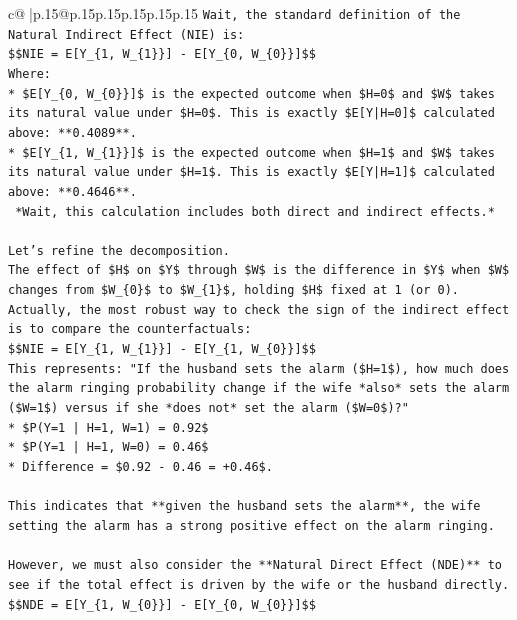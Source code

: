 \documentclass{article}
\begin{document}
{\begin{supertabular}{c@{$\;$}|p{.15\linewidth}@{}p{.15\linewidth}p{.15\linewidth}p{.15\linewidth}p{.15\linewidth}p{.15\linewidth}}
{{{\texttt{Wait, the standard definition of the Natural Indirect Effect (NIE) is:} \\
\texttt{\$\$NIE = E{[}Y\_\{1, W\_\{1\}\}{]} {-} E{[}Y\_\{0, W\_\{0\}\}{]}\$\$} \\
\texttt{Where:} \\
\texttt{*   \$E{[}Y\_\{0, W\_\{0\}\}{]}\$ is the expected outcome when \$H=0\$ and \$W\$ takes its natural value under \$H=0\$. This is exactly \$E{[}Y|H=0{]}\$ calculated above: **0.4089**.} \\
\texttt{*   \$E{[}Y\_\{1, W\_\{1\}\}{]}\$ is the expected outcome when \$H=1\$ and \$W\$ takes its natural value under \$H=1\$. This is exactly \$E{[}Y|H=1{]}\$ calculated above: **0.4646**.} \\
\texttt{    *Wait, this calculation includes both direct and indirect effects.*} \\
\\ 
\texttt{Let's refine the decomposition.} \\
\texttt{The effect of \$H\$ on \$Y\$ through \$W\$ is the difference in \$Y\$ when \$W\$ changes from \$W\_\{0\}\$ to \$W\_\{1\}\$, holding \$H\$ fixed at 1 (or 0).} \\
\texttt{Actually, the most robust way to check the sign of the indirect effect is to compare the counterfactuals:} \\
\texttt{\$\$NIE = E{[}Y\_\{1, W\_\{1\}\}{]} {-} E{[}Y\_\{1, W\_\{0\}\}{]}\$\$} \\
\texttt{This represents: "If the husband sets the alarm (\$H=1\$), how much does the alarm ringing probability change if the wife *also* sets the alarm (\$W=1\$) versus if she *does not* set the alarm (\$W=0\$)?"} \\
\texttt{*   \$P(Y=1 | H=1, W=1) = 0.92\$} \\
\texttt{*   \$P(Y=1 | H=1, W=0) = 0.46\$} \\
\texttt{*   Difference = \$0.92 {-} 0.46 = +0.46\$.} \\
\\ 
\texttt{This indicates that **given the husband sets the alarm**, the wife setting the alarm has a strong positive effect on the alarm ringing.} \\
\\ 
\texttt{However, we must also consider the **Natural Direct Effect (NDE)** to see if the total effect is driven by the wife or the husband directly.} \\
\texttt{\$\$NDE = E{[}Y\_\{1, W\_\{0\}\}{]} {-} E{[}Y\_\{0, W\_\{0\}\}{]}\$\$} \\
}}}
\end{supertabular}}
\end{document}
